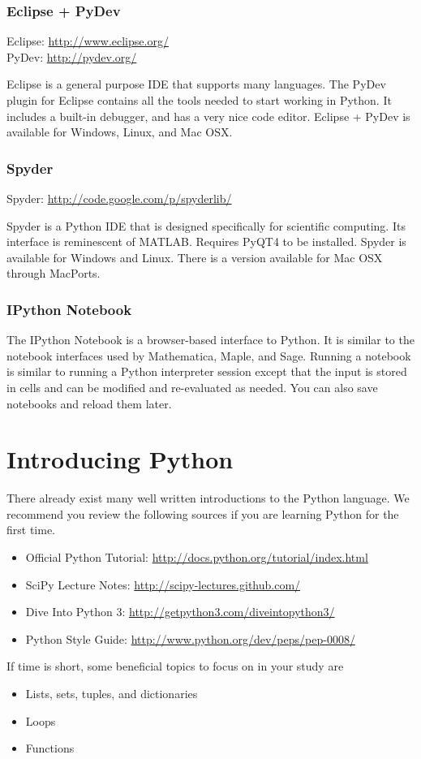 \subsubsection*{Eclipse + PyDev}

Eclipse: \url{http://www.eclipse.org/} \\
PyDev: \url{http://pydev.org/}

Eclipse is a general purpose IDE that supports many languages.  
The PyDev plugin for Eclipse contains all the tools needed to start working in Python.
It includes a built-in debugger, and has a very nice code editor. 
Eclipse + PyDev is available for Windows, Linux, and Mac OSX.

\subsubsection*{Spyder}

Spyder: \url{http://code.google.com/p/spyderlib/}

Spyder is a Python IDE that is designed specifically for scientific computing. 
Its interface is reminescent of MATLAB. 
Requires PyQT4 to be installed. 
Spyder is available for Windows and Linux.  
There is a version available for Mac OSX through MacPorts.

\subsubsection*{IPython Notebook}
The IPython Notebook is a browser-based interface to Python.
It is similar to the notebook interfaces used by Mathematica, Maple, and Sage.
Running a notebook is similar to running a Python interpreter session except that the input is stored in cells and can be modified and re-evaluated as needed.
You can also save notebooks and reload them later.

\section*{Introducing Python}
There already exist many well written introductions to the Python language. 
We recommend you review the following sources if you are learning Python for the first time.

\begin{itemize}
\item Official Python Tutorial: \url{http://docs.python.org/tutorial/index.html}
\item SciPy Lecture Notes: \url{http://scipy-lectures.github.com/}
\item Dive Into Python 3: \url{http://getpython3.com/diveintopython3/}
\item Python Style Guide: \url{http://www.python.org/dev/peps/pep-0008/}
\end{itemize}
If time is short, some beneficial topics to focus on in your study are
\begin{itemize}
\item Lists, sets, tuples, and dictionaries
\item Loops
\item Functions
\end{itemize}

